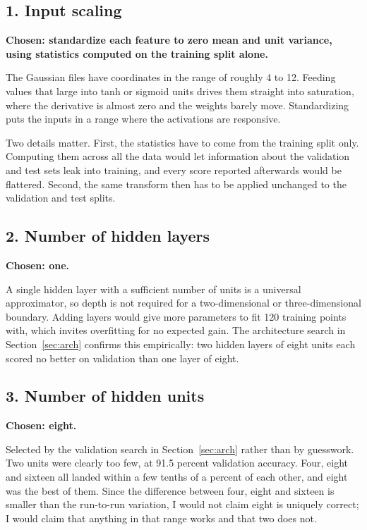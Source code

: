 \documentclass[11pt]{article}
\begin{document}
\subsection*{1. Input scaling}
\textbf{Chosen: standardize each feature to zero mean and unit variance, using
statistics computed on the training split alone.}

The Gaussian files have coordinates in the range of roughly 4 to 12. Feeding
values that large into tanh or sigmoid units drives them straight into
saturation, where the derivative is almost zero and the weights barely move.
Standardizing puts the inputs in a range where the activations are responsive.

Two details matter. First, the statistics have to come from the training split
only. Computing them across all the data would let information about the
validation and test sets leak into training, and every score reported
afterwards would be flattered. Second, the same transform then has to be applied
unchanged to the validation and test splits.

\subsection*{2. Number of hidden layers}
\textbf{Chosen: one.}

A single hidden layer with a sufficient number of units is a universal
approximator, so depth is not required for a two-dimensional or
three-dimensional boundary. Adding layers would give more parameters to fit 120
training points with, which invites overfitting for no expected gain. The
architecture search in Section~\ref{sec:arch} confirms this empirically: two
hidden layers of eight units each scored no better on validation than one layer
of eight.

\subsection*{3. Number of hidden units}
\textbf{Chosen: eight.}

Selected by the validation search in Section~\ref{sec:arch} rather than by
guesswork. Two units were clearly too few, at 91.5 percent validation accuracy.
Four, eight and sixteen all landed within a few tenths of a percent of each
other, and eight was the best of them. Since the difference between four,
eight and sixteen is smaller than the run-to-run variation, I would not claim
eight is uniquely correct; I would claim that anything in that range works and
that two does not.
\end{document}
